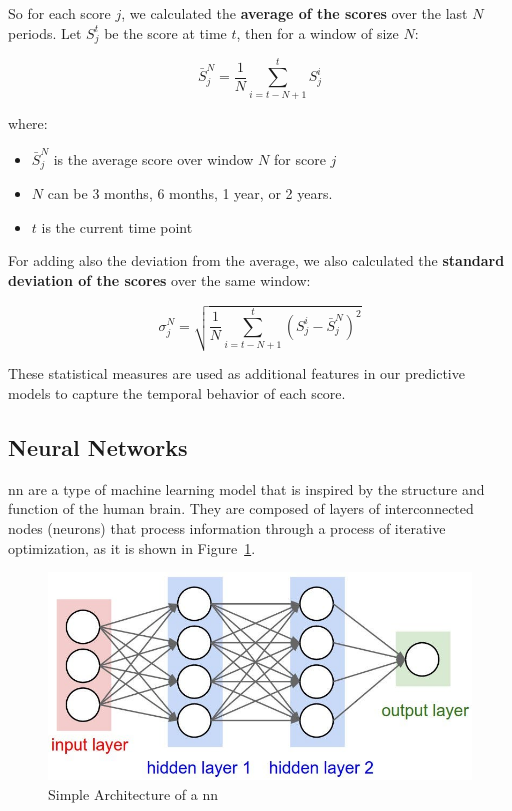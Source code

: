 \documentclass[11pt,english,a4paper,hidelinks]{book}
\begin{document}
\vspace{0.5cm}
\noindent So for each score \(j\), we calculated the \textbf{average of the scores} over the last \(N\) periods. Let \(S_j^t\) be the score at time \(t\), then for a window of size \(N\):

\begin{equation}
    \bar{S}_j^N = \frac{1}{N} \sum_{i=t-N+1}^{t} S_j^i
\end{equation}

\noindent where:
\begin{itemize}
    \item \(\bar{S}_j^N\) is the average score over window \(N\) for score \(j\)
    \item \(N\) can be 3 months, 6 months, 1 year, or 2 years.
    \item \(t\) is the current time point
\end{itemize}

\noindent For adding also the deviation from the average, we also calculated the \textbf{standard deviation of the scores} over the same window:

\begin{equation}
    \sigma_j^N = \sqrt{\frac{1}{N} \sum_{i=t-N+1}^{t} (S_j^i - \bar{S}_j^N)^2}
\end{equation}

\noindent These statistical measures are used as additional features in our predictive models to capture the temporal behavior of each score.

\subsection{Neural Networks}
\acrshort{nn} are a type of machine learning model that is inspired by the structure and function of the human brain. They are composed of layers of interconnected nodes (neurons) that process information through a process of iterative optimization, as it is shown in Figure~\ref{fig:nn-basic-schema}.

\vspace{0.5cm}
\begin{figure}[H]
    \centering
    \includegraphics[width=1\textwidth]{images/code/neural_network/basic_schema.png}
    \caption{Simple Architecture of a \acrshort{nn}}
    \label{fig:nn-basic-schema}
\end{figure}
\end{document}

